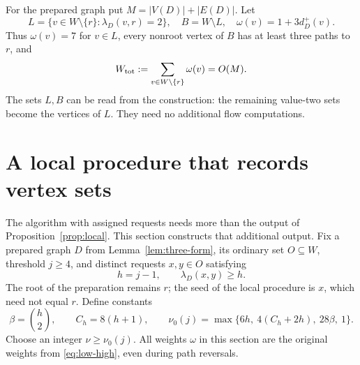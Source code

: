 \documentclass[11pt]{article}
\theoremstyle{definition}
\theoremstyle{remark}
\newcommand{\wt}{\omega}
\begin{document}
For the prepared graph put \(M=|V(D)|+|E(D)|\). Let
\begin{equation}
 L=\{v\in W\setminus\{r\}:\lambda_D(v,r)=2\},\quad
 B=W\setminus L,\quad
 \wt(v)=1+3d_D^+(v).
 \label{eq:low-high}
\end{equation}
Thus \(\wt(v)=7\) for \(v\in L\), every nonroot vertex of \(B\) has at least three paths to \(r\), and
\begin{equation}
 W_{\rm tot}:=\sum_{v\in W\setminus\{r\}}\wt(v)=O(M).
 \label{eq:weight-total}
\end{equation}
The sets \(L,B\) can be read from the construction: the remaining value-two sets become the vertices of \(L\). They need no additional flow computations.

\section{A local procedure that records vertex sets}
\label{sec:recorded-local}
The algorithm with assigned requests needs more than the output of Proposition~\ref{prop:local}. This section constructs that additional output. Fix a prepared graph \(D\) from Lemma~\ref{lem:three-form}, its ordinary set \(O\subseteq W\), threshold \(j\ge4\), and distinct requests \(x,y\in O\) satisfying
\begin{equation}
 h=j-1,\qquad \lambda_D(x,y)\ge h.
 \label{eq:recorded-floor}
\end{equation}
The root of the preparation remains \(r\); the seed of the local procedure is \(x\), which need not equal \(r\). Define constants
\[
 \beta=\binom h2,\qquad C_h=8(h+1),\qquad
 \nu_0(j)=\max\{6h,\ 4(C_h+2h),\ 28\beta,\ 1\}.
\]
Choose an integer \(\nu\ge\nu_0(j)\). All weights \(\wt\) in this section are the original weights from \eqref{eq:low-high}, even during path reversals.
\end{document}

